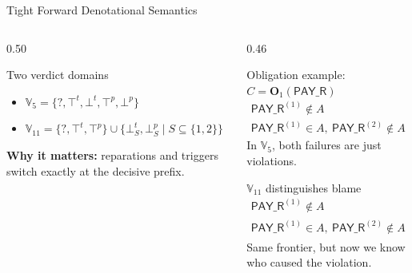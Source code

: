 \documentclass[9pt,aspectratio=169]{beamer}
\newcommand{\obl}[2][]{\mathbf{O}_{#1}(#2)}
\newcommand{\topt}{\top^t}
\newcommand{\bott}{\bot^t}
\newcommand{\topp}{\top^p}
\newcommand{\botp}{\bot^p}
\newcommand{\bottp}[1]{\mathbin{\bot^{t}_{#1}}}
\newcommand{\botpp}[1]{\mathbin{\bot^{p}_{#1}}}
\newcommand{\PAY}{\ensuremath{\mathsf{PAY\_R}}\xspace}
\begin{document}
\begin{frame}{Tight Forward  Denotational Semantics}
\small
\begin{columns}[T,totalwidth=\textwidth]
\begin{column}{0.50\textwidth}
  \begin{block}{Two verdict domains}
    \footnotesize
    \begin{itemize}
      \item $\mathbb{V}_5=\{?,\topt,\bott,\topp,\botp\}$
      \item $\mathbb{V}_{11}=\{?,\topt,\topp\}\cup\{\bottp{S},\botpp{S}\mid S\subseteq\{1,2\}\}$
    \end{itemize}
  \end{block}
\textbf{Why it matters:} reparations and triggers switch exactly at the decisive prefix.
\end{column}
\begin{column}{0.46\textwidth}
  \begin{block}{Obligation example: $C=\obl[1]{\PAY}$}
    \footnotesize
    \[
    \begin{array}{lcl}
    \PAY^{(1)}\notin A &\Rightarrow& \mathbb{V}_5:\ \bott\\[2pt]
    \PAY^{(1)}\in A,\ \PAY^{(2)}\notin A &\Rightarrow& \mathbb{V}_5:\ \bott
    \end{array}
    \]
    In $\mathbb{V}_5$, both failures are just violations.
  \end{block}

  \begin{block}{$\mathbb{V}_{11}$ distinguishes blame}
    \footnotesize
    \[
    \begin{array}{lcl}
    \PAY^{(1)}\notin A &\Rightarrow& \bottp{\{1\}}\\[2pt]
    \PAY^{(1)}\in A,\ \PAY^{(2)}\notin A &\Rightarrow& \bottp{\{2\}}
    \end{array}
    \]
    Same frontier, but now we know who caused the violation.
  \end{block}
\end{column}
\end{columns}
\end{frame}
\end{document}
